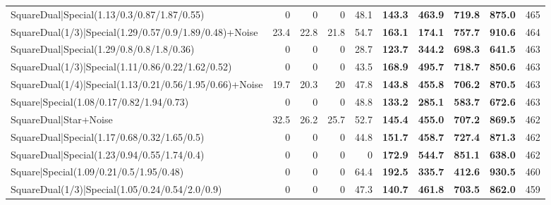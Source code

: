 \begin{tabular}{lrrrrllllr}
 SquareDual|Special(1.13/0.3/0.87/1.87/0.55)             &          0   &          0   &          0   &            48.1 & \textbf{143.3} & \textbf{463.9} & \textbf{719.8} & \textbf{875.0}  &          465 \\
 SquareDual(1/3)|Special(1.29/0.57/0.9/1.89/0.48)+Noise  &         23.4 &         22.8 &         21.8 &            54.7 & \textbf{163.1} & \textbf{174.1} & \textbf{757.7} & \textbf{910.6}  &          464 \\
 SquareDual|Special(1.29/0.8/0.8/1.8/0.36)               &          0   &          0   &          0   &            28.7 & \textbf{123.7} & \textbf{344.2} & \textbf{698.3} & \textbf{641.5}  &          463 \\
 SquareDual(1/3)|Special(1.11/0.86/0.22/1.62/0.52)       &          0   &          0   &          0   &            43.5 & \textbf{168.9} & \textbf{495.7} & \textbf{718.7} & \textbf{850.6}  &          463 \\
 SquareDual(1/4)|Special(1.13/0.21/0.56/1.95/0.66)+Noise &         19.7 &         20.3 &         20   &            47.8 & \textbf{143.8} & \textbf{455.8} & \textbf{706.2} & \textbf{870.5}  &          463 \\
 Square|Special(1.08/0.17/0.82/1.94/0.73)                &          0   &          0   &          0   &            48.8 & \textbf{133.2} & \textbf{285.1} & \textbf{583.7} & \textbf{672.6}  &          463 \\
 SquareDual|Star+Noise                                   &         32.5 &         26.2 &         25.7 &            52.7 & \textbf{145.4} & \textbf{455.0} & \textbf{707.2} & \textbf{869.5}  &          462 \\
 SquareDual|Special(1.17/0.68/0.32/1.65/0.5)             &          0   &          0   &          0   &            44.8 & \textbf{151.7} & \textbf{458.7} & \textbf{727.4} & \textbf{871.3}  &          462 \\
 SquareDual|Special(1.23/0.94/0.55/1.74/0.4)             &          0   &          0   &          0   &             0   & \textbf{172.9} & \textbf{544.7} & \textbf{851.1} & \textbf{638.0}  &          462 \\
 Square|Special(1.09/0.21/0.5/1.95/0.48)                 &          0   &          0   &          0   &            64.4 & \textbf{192.5} & \textbf{335.7} & \textbf{412.6} & \textbf{930.5}  &          460 \\
 SquareDual(1/3)|Special(1.05/0.24/0.54/2.0/0.9)         &          0   &          0   &          0   &            47.3 & \textbf{140.7} & \textbf{461.8} & \textbf{703.5} & \textbf{862.0}  &          459 \\

\end{tabular}
